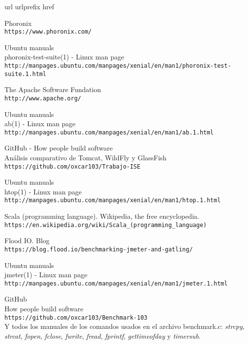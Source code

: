 \begin{thebibliography}{10}
\expandafter\ifx\csname url\endcsname\relax
  \def\url#1{\texttt{#1}}\fi
\expandafter\ifx\csname urlprefix\endcsname\relax\def\urlprefix{URL }\fi
\expandafter\ifx\csname href\endcsname\relax
  \def\href#1#2{#2} \def\path#1{#1}\fi

Phoronix\\
  \url{https://www.phoronix.com/}

Ubuntu manuals\\
phoronix-test-suite(1) - Linux man page\\
  \url{http://manpages.ubuntu.com/manpages/xenial/en/man1/phoronix-test-suite.1.html}

The Apache Software Fundation\\
  \url{http://www.apache.org/}

Ubuntu manuals\\
ab(1) - Linux man page\\
  \url{http://manpages.ubuntu.com/manpages/xenial/en/man1/ab.1.html}

GitHub - How people build software\\
Análisis comparativo de Tomcat, WildFly y GlassFish\\
  \url{https://github.com/oxcar103/Trabajo-ISE}

Ubuntu manuals\\
htop(1) - Linux man page\\
  \url{http://manpages.ubuntu.com/manpages/xenial/en/man1/htop.1.html}

Scala (programming language). Wikipedia, the free encyclopedia.\\
  \url{https://en.wikipedia.org/wiki/Scala_(programming_language)}

Flood IO. Blog\\
  \url{https://blog.flood.io/benchmarking-jmeter-and-gatling/}

Ubuntu manuals\\
jmeter(1) - Linux man page\\
  \url{http://manpages.ubuntu.com/manpages/xenial/en/man1/jmeter.1.html}

GitHub\\
How people build software\\
  \url{https://github.com/oxcar103/Benchmark-103}\\
Y todos los manuales de los comandos usados en el archivo benchmark.c: \textit{strcpy}\cite{man_strcpy},
\textit{strcat}\cite{man_strcat}, \textit{fopen}\cite{man_fopen}, \textit{fclose}\cite{man_fclose},
\textit{fwrite}\cite{man_fwrite}, \textit{fread}\cite{man_fread}, \textit{fprintf}\cite{fprint},
\textit{gettimeofday}\cite{man_gettimeofday} y \textit{timersub}\cite{man_timersub}.

\end{thebibliography}

